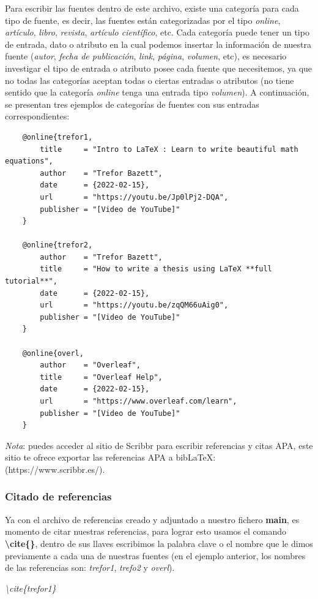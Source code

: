 Para escribir las fuentes dentro de este archivo, existe una categoría para cada tipo de fuente, es decir, las fuentes están categorizadas por el tipo \textit{online}, \textit{artículo}, \textit{libro}, \textit{revista}, \textit{artículo científico}, etc. Cada categoría puede tener un tipo de entrada, dato o atributo en la cual podemos insertar la información de nuestra fuente (\textit{autor}, \textit{fecha de publicación}, \textit{link}, \textit{página}, \textit{volumen}, etc), es necesario investigar el tipo de entrada o atributo posee cada fuente que necesitemos, ya que no todas las categorías aceptan todas o ciertas entradas o atributos (no tiene sentido que la categoría \textit{online} tenga una entrada tipo \textit{volumen}). A continuación, se presentan tres ejemplos de categorías de fuentes con sus entradas correspondientes:
\begin{lstlisting}
    @online{trefor1,
        title     = "Intro to LaTeX : Learn to write beautiful math equations",
        author    = "Trefor Bazett",
        date      = {2022-02-15},
        url       = "https://youtu.be/Jp0lPj2-DQA",
        publisher = "[Video de YouTube]"
    }

    @online{trefor2,
        author    = "Trefor Bazett",
        title     = "How to write a thesis using LaTeX **full tutorial**",
        date      = {2022-02-15},
        url       = "https://youtu.be/zqQM66uAig0",
        publisher = "[Video de YouTube]"
    }

    @online{overl,
        author    = "Overleaf",
        title     = "Overleaf Help",
        date      = {2022-02-15},
        url       = "https://www.overleaf.com/learn",
        publisher = "[Video de YouTube]"
    }
\end{lstlisting}

\textit{Nota}: puedes acceder al sitio de Scribbr para escribir referencias y citas APA, este sitio te ofrece exportar las referencias APA a bibLaTeX: (https://www.scribbr.es/).


\subsubsection{Citado de referencias}
\hspace{0.55cm}Ya con el archivo de referencias creado y adjuntado a nuestro fichero \textbf{main}, es momento de citar nuestras referencias, para lograr esto usamos el comando \textbf{\textbackslash{cite\{\}}}, dentro de sus llaves escribimos la palabra clave o el nombre que le dimos previamente a cada una de nuestras fuentes (en el ejemplo anterior, los nombres de las referencias son: \textit{trefor1}, \textit{trefo2} y \textit{overl}).
\begin{center}
    \textit{\textbackslash{cite\{trefor1\}}}
\end{center}


